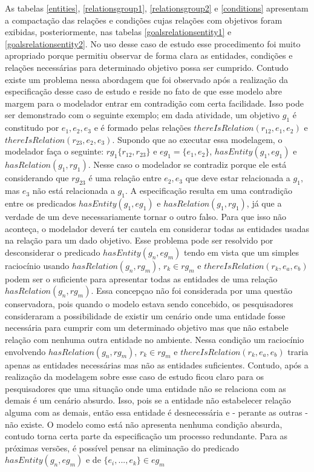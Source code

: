 As tabelas \ref{entities}, \ref{relationsgroup1}, \ref{relationsgroup2} e \ref{conditions} apresentam a compactação das relações e condições cujas relações com objetivos foram exibidas, 
posteriormente, nas tabelas \ref{goalsrelationsentity1} e \ref{goalsrelationsentity2}. No uso desse caso de estudo esse procedimento foi muito apropriado porque permitiu observar de forma 
clara as entidades, condições e relações necessárias para determinado objetivo possa ser cumprido. Contudo existe um problema nessa abordagem que foi observado após a realização da
especificação desse caso de estudo e reside no fato de que esse modelo abre margem para o modelador entrar em contradição com certa facilidade. Isso pode ser demonstrado com o  
seguinte exemplo; em dada atividade, um objetivo $g_1$ é constitudo por $e_1,e_2,e_3$ e é formado pelas relações $thereIsRelation(r_{12},e_1,e_2)$ e $thereIsRelation(r_{23},e_2,e_3)$. 
Supondo que ao executar essa modelagem, o modelador faça o seguinte: $rg_1 \{ r_{12},r_{23} \}$ e $ eg_1 = \{ e_1, e_2 \} $, $ hasEntity(g_1,eg_1) $ e $ hasRelation(g_1, rg_1) $. Nesse 
caso o modelador se contradiz porque ele está considerando que $rg_{23}$ é uma relação entre $e_2, e_3$ que deve estar relacionada a $g_1$, mas $e_3$ não está relacionada a $g_1$. A especificação 
resulta em uma contradição entre os predicados $ hasEntity(g_1,eg_1) $ e $ hasRelation(g_1, rg_1) $, já que a verdade de um deve necessariamente tornar 
o outro falso. Para que isso não aconteça, o modelador deverá ter cautela em considerar todas as entidades usadas na relação para um dado objetivo. Esse problema pode ser resolvido por 
desconsiderar o predicado $hasEntity(g_n,eg_m)$ tendo em vista que um simples raciocínio usando $hasRelation(g_n,rg_m)$, $r_k \in rg_m$ e $thereIsRelation(r_k, e_a,e_b)$ podem ser o suficiente 
para apresentar todas as entidades de uma relação $ hasRelation(g_n, rg_m) $. Essa concepçao não foi considerada por uma questão conservadora, pois quando o modelo estava sendo concebido, 
os pesquisadores consideraram a possibilidade de existir um cenário onde uma entidade fosse necessária para cumprir com um determinado objetivo mas que não estabele relação com nenhuma 
outra entidade no ambiente. Nessa condição um raciocínio envolvendo $hasRelation(g_n,rg_m)$, $r_k \in rg_m$ e $thereIsRelation(r_k, e_a,e_b)$ traria apenas as entidades necessárias 
mas não as entidades suficientes. Contudo, após a realização da modelagem sobre esse caso de estudo ficou claro para os pesquisadores que uma situação onde uma entidade não se relaciona 
com as demais é um cenário absurdo. Isso, pois se a entidade não estabelecer relação alguma com as demais, então essa entidade é desnecessária e - perante as outras - não existe. O modelo 
como está não apresenta nenhuma condição absurda, contudo torna certa parte da especificação um processo redundante. Para as próximas versões, é possível pensar na eliminação do predicado 
$ hasEntity(g_n,eg_m) $ e de $ \{ e_i , ... , e_k \} \in eg_m $
